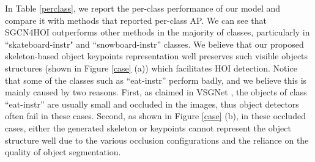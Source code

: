 \documentclass[a4paper, 10pt, conference]{IEEEtran}
\begin{document}
\begin{table}
	\centering
	\caption{Comparison of performance with other methods. Our model achieves a good trade-off between performance and computational complexity comparing with transformer-based models.}
	\label{AP-other}
\end{table}


In Table \ref{perclass}, we report the per-class performance of our model and compare it with methods that reported per-class AP. We can see that SGCN4HOI outperforms other methods in the majority of classes, particularly in ``skateboard-instr" and ``snowboard-instr'' classes. We believe that our proposed skeleton-based object keypoints representation well preserves such visible objects structures (shown in Figure \ref{case} (a)) which facilitates HOI detection. Notice that some of the classes such as ``eat-instr'' perform badly, and we believe this is mainly caused by two reasons. First, as claimed in VSGNet \cite{VSGNet}, the objects of class ``eat-instr'' are usually small and occluded in the images, thus object detectors often fail in these cases. Second, as shown in Figure \ref{case} (b), in these occluded cases, either the generated skeleton or keypoints cannot represent the object structure well due to the various occlusion configurations and the reliance on the quality of object segmentation.  
\end{document}
